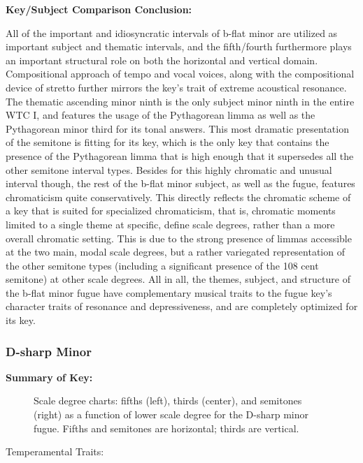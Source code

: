 \textbf{Key/Subject Comparison Conclusion:}

All of the important and idiosyncratic intervals of b-flat minor are
utilized as important subject and thematic intervals, and the
fifth/fourth furthermore plays an important structural role on both the
horizontal and vertical domain. Compositional approach of tempo and
vocal voices, along with the compositional device of stretto further
mirrors the key's trait of extreme acoustical resonance. The thematic
ascending minor ninth is the only subject minor ninth in the entire WTC
I, and features the usage of the Pythagorean limma as well as the
Pythagorean minor third for its tonal answers. This most dramatic
presentation of the semitone is fitting for its key, which is the only
key that contains the presence of the Pythagorean limma that is high
enough that it supersedes all the other semitone interval types. Besides
for this highly chromatic and unusual interval though, the rest of the
b-flat minor subject, as well as the fugue, features chromaticism quite
conservatively. This directly reflects the chromatic scheme of a key
that is suited for specialized chromaticism, that is, chromatic moments
limited to a single theme at specific, define scale degrees, rather than
a more overall chromatic setting. This is due to the strong presence of
limmas accessible at the two main, modal scale degrees, but a rather
variegated representation of the other semitone types (including a
significant presence of the 108 cent semitone) at other scale degrees.
All in all, the themes, subject, and structure of the b-flat minor fugue
have complementary musical traits to the fugue key's character traits of
resonance and depressiveness, and are completely optimized for its key.

    \subsubsection{D-sharp Minor}\label{d-sharp-minor}

\textbf{Summary of Key:}



\begin{figure}[H]
\vspace{1.5em}
    \centering
    \caption[Scale degree charts: fifths, thirds, and semitones as a function of lower scale degree for the D-sharp minor fugue. ]{Scale degree charts: fifths (left), thirds (center), and semitones (right) as a function of lower scale degree for the D-sharp minor fugue. Fifths and semitones are horizontal; thirds are vertical.}
\end{figure}    Temperamental Traits:

